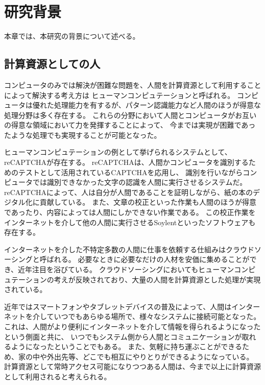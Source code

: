 \chapter{研究背景}\label{chap:background}

本章では、本研究の背景について述べる。

\section{計算資源としての人}\label{ux8a08ux7b97ux8cc7ux6e90ux3068ux3057ux3066ux306eux4eba}

コンピュータのみでは解決が困難な問題を、人間を計算資源として利用することによって解決する考え方は
ヒューマンコンピュテーション\cite{humancomputation}と呼ばれる。
コンピュータは優れた処理能力を有するが、パターン認識能力など人間のほうが得意な処理分野は多く存在する。
これらの分野において人間とコンピュータがお互いの得意な領域において力を発揮することによって、
今までは実現が困難であったような処理でも実現することが可能となった。

ヒューマンコンピュテーションの例として挙げられるシステムとして、reCAPTCHA\cite{recaptcha}が存在する。
reCAPTCHAは、人間かコンピュータを識別するためのテストとして活用されているCAPTCHA\cite{captcha}を応用し、
識別を行いながらコンピュータでは識別できなかった文字の認識を人間に実行させるシステムだ。
reCAPTCHAによって、人は自分が人間であることを証明しながら、紙の本のデジタル化に貢献している。
また、文章の校正といった作業も人間のほうが得意であったり、内容によっては人間にしかできない作業である。
この校正作業をインターネットを介して他の人間に実行させるSoylent\cite{soylent}といったソフトウェアも存在する。

インターネットを介した不特定多数の人間に仕事を依頼する仕組みはクラウドソーシング\cite{riseofcrowdsourcing}と呼ばれる。
必要なときに必要なだけの人材を安価に集めることができ、近年注目を浴びている。
クラウドソーシングにおいてもヒューマンコンピュテーションの考えが反映されており、大量の人間を計算資源とした処理が実現されている。

近年ではスマートフォンやタブレットデバイスの普及によって、人間はインターネットを介していつでもあらゆる場所で、様々なシステムに接続可能となった。
これは、人間がより便利にインターネットを介して情報を得られるようになったという側面と共に、
いつでもシステム側から人間とコミュニケーションが取れるようになったということでもある。
また、気軽に持ち運ぶことができるため、家の中や外出先等、どこでも相互にやりとりができるようになっている。
計算資源として常時アクセス可能になりつつある人間は、今まで以上に計算資源として利用されると考えられる。

